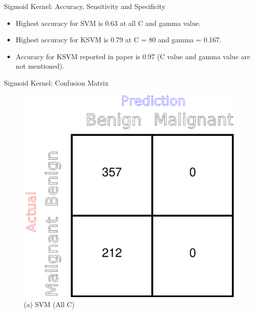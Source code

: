 \documentclass[xcolor=dvipsnames]{beamer}
\begin{document}
\begin{frame}{Sigmoid Kernel: Accuracy, Sensitivity and Specificity}
\begin{block}{}
\begin{itemize}
\item Highest accuracy for SVM is 0.63 at all C and gamma value.
\item Highest accuracy for KSVM is 0.79 at C = 80 and gamma = 0.167.
\item Accuracy for KSVM reported in paper is 0.97 \alert{(C value and gamma value are not mentioned)}.
\end{itemize}
\end{block}
\end{frame}

\begin{frame}{Sigmoid Kernel: Confusion Matrix}
\begin{figure}[H]
\begin{minipage}[t]{0.5\linewidth}
    \includegraphics[trim={9cm 0cm 0cm 0cm},clip,scale=0.43]{Figures/SVM_Sigmoid_CM.eps}
    \caption*{(a) SVM (All C)}
\end{minipage}%
\begin{minipage}[t]{0.5\linewidth}

\end{minipage}
\end{figure}
\end{frame}
\end{document}
